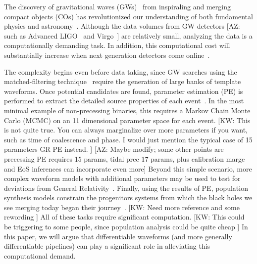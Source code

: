\documentclass[twocolumn]{aastex631}
\newcommand{\kw}[1]{{\color{rb4}[KW: #1 ]}}
\newcommand{\AZ}[1]{{\color{Burnt}[AZ: #1]}}
\begin{document}
The discovery of gravitational waves (GWs)~\citep{LIGOScientific:2016aoc} from inspiraling and merging compact objects (COs) has revolutionized our understanding of both fundamental physics and astronomy~\citep[e.g.][]{LIGOScientific:2021djp,LIGOScientific:2021sio,LIGOScientific:2021psn}.
Although the data volumes from GW detectors 
\AZ{such as Advanced LIGO~\citep{LIGOScientific:2014pky} and Virgo~\citep{VIRGO:2014yos}} 
are relatively small, analyzing the data is a computationally demanding task.
In addition, this computational cost will substantially increase when next generation detectors come online~\citep{Maggiore:2019uih, Reitze:2019iox, Evans:2021gyd}.

The complexity begins even before data taking, since GW searches using the matched-filtering technique~\citep{Owen:1998dk, Owen:1995tm} require the generation of large banks of template waveforms.
Once potential candidates are found, parameter estimation (PE) is performed to extract the detailed source properties of each event~\citep{Christensen:2022bxb, 2020MNRAS.493.3132S, Ashton:2018jfp, Romero-Shaw:2020owr, Veitch:2014wba, Biwer:2018osg}.
In the most minimal example of non-precessing binaries, this requires a Markov Chain Monte Carlo (MCMC) on an 11 dimensional parameter space for each event.
\kw{This is not quite true. You can always marginalize over more parameters if you want, such as time of coalescence and phase. I would just mention the typical case of 15 parameters GR PE instead.}
\AZ{Maybe modify; some other points are precessing PE requires 15 params, tidal prec 17 params, plus calibration marge and EoS inferences can incorporate even more}
Beyond this simple scenario, more complex waveform models with additional parameters may be used to test for deviations from General Relativity~\citep{Krishnendu:2021fga, LIGOScientific:2020tif, LIGOScientific:2016lio, Yunes:2016jcc, Arun:2006yw, Agathos:2013upa}.
Finally, using the results of PE, population synthesis models constrain the progenitors systems from which the black holes we see merging today began their journey~\citep{LIGOScientific:2020kqk, LIGOScientific:2021psn, Wong:2022flg}.
\kw{Need more reference and some rewording}
All of these tasks require significant computation.
\kw{This could be triggering to some people, since population analysis could be quite cheap}
In this paper, we will argue that differentiable waveforms (and more generally differentiable pipelines) can play a significant role in alleviating this computational demand.
\end{document}
